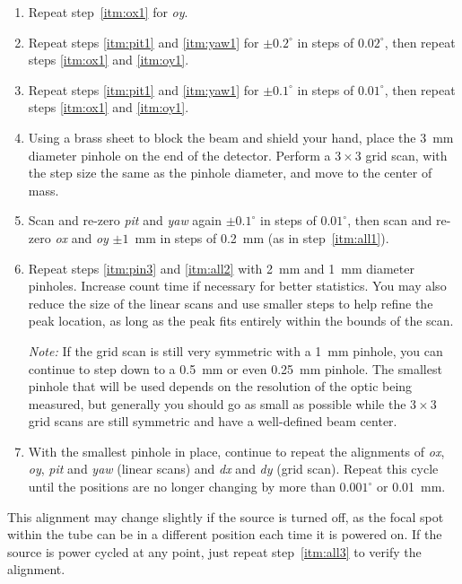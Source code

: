 \begin{enumerate}
\item \label{itm:oy1} Repeat step~\ref{itm:ox1} for \textit{oy}.

\item Repeat steps \ref{itm:pit1} and \ref{itm:yaw1} for $\pm 0.2 ^\circ$ in
  steps of $0.02^\circ$, then repeat steps \ref{itm:ox1} and \ref{itm:oy1}.

\item \label{itm:all1} Repeat steps \ref{itm:pit1} and \ref{itm:yaw1} for $\pm
  0.1 ^\circ$ in steps of $0.01^\circ$, then repeat steps \ref{itm:ox1} and
  \ref{itm:oy1}.

\item \label{itm:pin3} Using a brass sheet to block the beam and shield your
  hand, place the 3~mm diameter pinhole on the end of the detector. Perform a
  $3\times3$ grid scan, with the step size the same as the pinhole diameter, and
  move to the center of mass.

\item \label{itm:all2} Scan and re-zero \textit{pit} and \textit{yaw} again $\pm
  0.1 ^\circ$ in steps of $0.01^\circ$, then scan and re-zero \textit{ox} and
  \textit{oy} $\pm 1$~mm in steps of 0.2~mm (as in step~\ref{itm:all1}).

\item Repeat steps \ref{itm:pin3} and \ref{itm:all2} with 2~mm and 1~mm diameter
  pinholes. Increase count time if necessary for better statistics. You may also
  reduce the size of the linear scans and use smaller steps to help refine the
  peak location, as long as the peak fits entirely within the bounds of the
  scan.

\textit{Note:} If the grid scan is still very symmetric with a 1~mm pinhole, you
can continue to step down to a 0.5~mm or even 0.25~mm pinhole. The smallest
pinhole that will be used depends on the resolution of the optic being measured,
but generally you should go as small as possible while the $3\times3$ grid scans
are still symmetric and have a well-defined beam center.

\item \label{itm:all3} With the smallest pinhole in place, continue to repeat
  the alignments of \textit{ox}, \textit{oy}, \textit{pit} and \textit{yaw}
  (linear scans) and \textit{dx} and \textit{dy} (grid scan). Repeat this cycle
  until the positions are no longer changing by more than $0.001^\circ$ or
  0.01~mm.

\end{enumerate}
This alignment may change slightly if the source is turned off, as the focal
spot within the tube can be in a different position each time it is powered
on. If the source is power cycled at any point, just repeat step~\ref{itm:all3}
to verify the alignment.

